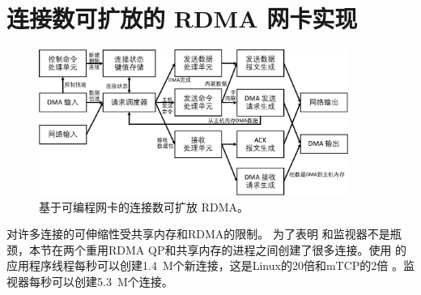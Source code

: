 \section{连接数可扩放的 RDMA 网卡实现}
\label{socksdirect:sec:discussion}


\begin{figure}[htbp]
	\centering
	\includegraphics[width=0.9\textwidth]{images/scalable_rdma.pdf}	
	\caption{基于可编程网卡的连接数可扩放 RDMA。}
	\label{socksdirect:fig:scalable-rdma}
\end{figure}



\sys {}对许多连接的可伸缩性受共享内存和RDMA的限制。
为了表明 \libipc {} 和监视器不是瓶颈，本节在两个重用RDMA QP和共享内存的进程之间创建了很多连接。使用 \libipc {} 的应用程序线程每秒可以创建1.4~M个新连接，这是Linux的20倍和mTCP的2倍 \cite {jeong2014mtcp}。监视器每秒可以创建5.3~M个连接。

